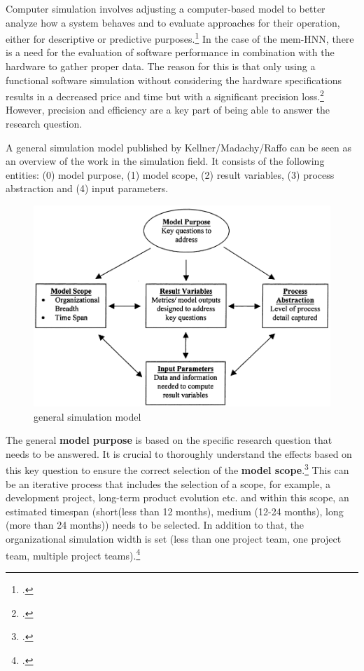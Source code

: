 Computer simulation involves adjusting a computer-based model to better analyze how a system behaves and to evaluate approaches for their operation, either for descriptive or predictive purposes.\footcite[cf.][13-14]{abarAgentBasedModelling2017}
In the case of the \ac{mem-HNN}, there is a need for the evaluation of software performance in combination with the hardware to gather proper data.
The reason for this is that only using a functional software simulation without considering the hardware specifications results in a decreased price and time but with a significant precision loss.\footcite[cf.][470-471]{sarhadiStateArtHardware2015}
However, precision and efficiency are a key part of being able to answer the research question.

A general simulation model published by Kellner/Madachy/Raffo can be seen as an overview of the work in the simulation field.
It consists of the following entities: (0) model purpose, (1) model scope, (2) result variables, (3) process abstraction and (4) input parameters.  

\begin{figure}[H]
    \centering
    \includegraphics[width=0.7\linewidth]{graphics/Simulation_Modell.png}
    \caption{general simulation model\protect\footnotemark}
    \label{simulation_Modell}
\end{figure}

The general \textbf{model purpose} is based on the specific research question that needs to be answered.
It is crucial to thoroughly understand the effects based on this key question to ensure the correct selection of the \textbf{model scope}.\footcite[cf.][95]{kellnerSoftwareProcessSimulation1999}
This can be an iterative process that includes the selection of a scope, for example, a development project, long-term product evolution etc. and within 
this scope, an estimated timespan (short(less than 12 months), medium (12-24 months), long (more than 24 months)) needs to be selected. 
In addition to that, the organizational simulation width is set (less than one project team, one project team, multiple project teams).\footcite[cf.][96]{kellnerSoftwareProcessSimulation1999}

